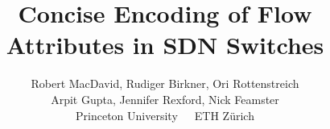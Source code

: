 \documentclass[10pt,twocolumn]{confpaper}
\date{}
\title{
{\ttlfnt Concise Encoding of Flow Attributes in SDN Switches}}
\author{
{\aufnt Robert MacDavid\ptn, Rudiger Birkner\et, Ori Rottenstreich\ptn }\\
{\aufnt Arpit Gupta\ptn,  Jennifer Rexford\ptn, Nick Feamster\ptn}\\
\ptn\normalsize{Princeton University}~~~\et\normalsize{ETH Z\"{u}rich}\\
}
\begin{document}
\maketitle
\thispagestyle{empty}


\begin{sloppypar}












\end{sloppypar}
\balance


%
\end{document}
